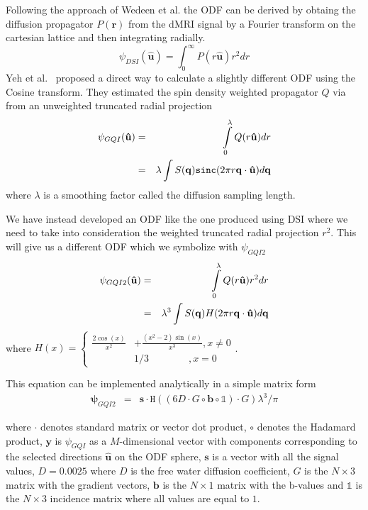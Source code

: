 \documentclass[9pt,conference,a4paper]{IEEEtran}
\begin{document}
Following the approach of Wedeen et al.
\cite{Wedeen} 
the ODF can be derived by obtaing the diffusion propagator $P(\mathbf{r})$ from the dMRI signal
by a Fourier transform on the cartesian lattice and then integrating radially. 
\begin{equation}
\psi_{DSI}(\hat{\mathbf{u}})=\int_{0}^{\infty}P(r\hat{\mathbf{u}})r^{2}dr\label{eq:ODF_DSI}
\end{equation}
Yeh
et al.~\cite{Yeh2010} proposed a direct way to calculate a slightly
different ODF using the Cosine transform. 
They estimated the spin density weighted propagator $Q$ via
from an unweighted truncated radial projection
\begin{eqnarray}
\psi_{GQI}(\mathbf{\hat{u}}) & = & \intop_{0}^{\lambda}Q(r\mathbf{\hat{u}})dr\label{eq:SDF}\nonumber\\
 & = & \lambda\int S(\mathbf{q})\mathtt{sinc}(2\pi r\mathbf{q}\cdot\mathbf{\hat{u}})d\mathbf{q}
\end{eqnarray}
where $\lambda$ is a smoothing factor called the diffusion sampling length.

We have instead developed an ODF like the one produced using
DSI where we need to take into consideration the weighted truncated
radial projection $r^2$. This will give us a different ODF which we symbolize
with $\psi_{GQI2}$\begin{eqnarray}
\psi_{GQI2}(\mathbf{\hat{u}}) & = & \intop_{0}^{\lambda}Q(r\mathbf{\hat{u}})r^{2}dr\nonumber\label{eq:SDF2}\\
 & = & \lambda^{3}\int S(\mathbf{q})H(2\pi r\mathbf{q}\cdot\mathbf{\hat{u}})d\mathbf{q}\end{eqnarray}
\noindent where $H(x)=\begin{cases}
\frac{2\cos(x)}{x^{2}} & +\frac{(x^{2}-2)\sin(x)}{x^{3}},x\neq0\\
 & 1/3\qquad\qquad,x=0\end{cases}$.
\begin{flushleft}
This equation can be implemented analytically in a simple matrix form
\begin{eqnarray}
\bm{\psi}_{GQI2} & = & \mathbf{s}\cdot\mathtt{H}((6D\cdot G\circ\mathbf{b}\circ\mathbb{1})\cdot G)\lambda^{3}/\pi\label{eq:GQI2}
\end{eqnarray}

\par\end{flushleft}

\begin{flushleft}
where $\cdot$ denotes standard matrix or vector dot product, $\circ$
denotes the Hadamard product, $\mathbf{y}$ is $\psi_{GQI}$ as a
$M$-dimensional vector with components corresponding to the selected
directions $\hat{\mathbf{u}}$ on the ODF sphere, $\mathbf{s}$ is
a vector with all the signal values, $D=0.0025$
where $D$ is the free water diffusion coefficient,
$G$ is the $N\times3$ matrix with the gradient vectors, $\mathbf{b}$
is the $N\times1$ matrix with the b-values and $\mathbb{1}$ is the
$N\times3$ incidence matrix where all values are equal to $1$.
\par\end{flushleft}
\end{document}
